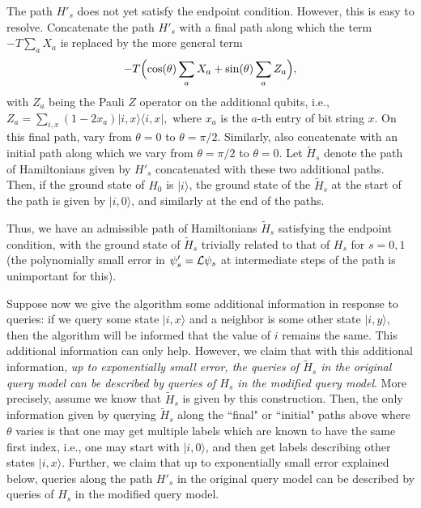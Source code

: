 \documentclass[letterpaper,onecolumn]{quantumarticle}
\newcommand{\isL}{{\cal L}}
\begin{document}
The path $H'_s$ does not yet satisfy the endpoint condition.  However, this is easy to resolve.  
Concatenate the path $H'_s$ with a final path along
which the term $-T \sum_a X_a$ is replaced by the more general term
$$-T\Bigl( \cos(\theta) \sum_a X_a + \sin(\theta) \sum_a Z_a\Bigr),$$
with $Z_a$ being the Pauli $Z$ operator on the additional qubits, i.e., $Z_a=\sum_{i,x} (1-2x_a)  |i,x\rangle \langle i,x|,$
where $x_a$ is the $a$-th entry of bit string $x$.
On this final path, vary from $\theta=0$ to $\theta=\pi/2$.
Similarly, also concatenate with an initial path along which we vary from $\theta=\pi/2$ to $\theta=0$.
Let $\tilde H_s$ denote the path of Hamiltonians given by $H'_s$ concatenated with these two additional paths.
Then, if the ground state of $H_0$ is $|i\rangle$, the ground state of the $\tilde H_s$ at the start of the path is given by $|i,0\rangle$, and similarly at the end of the paths.

Thus, we have an admissible path of Hamiltonians $\tilde H_s$ satisfying the endpoint condition, with the ground state of $\tilde H_s$ trivially related to that of $H_s$ for $s=0,1$ (the polynomially small error in $\psi'_s=\isL \psi_s$ at intermediate steps of the path is unimportant for this).

Suppose now we give the algorithm some additional information in response to queries: if we query some state $|i,x\rangle$ and a neighbor is some other state $|i,y\rangle$, then the algorithm will be informed that the value of $i$ remains the same.  This additional information can only help.
However, we claim that with this additional information, {\it up to exponentially small error, the queries of $\tilde H_s$ in the original query model can be described by queries of $H_s$ in the modified query model}.
More precisely, assume we know that $\tilde H_s$ is given by this construction.  Then, the only information given by querying $\tilde H_s$ along the ``final" or ``initial" paths above where $\theta$ varies is that one may get multiple labels which are known to have the same first index, i.e., one may start with $|i,0\rangle$, and then get labels describing other states $|i,x\rangle$.  Further, we claim that up to exponentially small error explained below, queries along the path $H'_s$ in the original query model can be described by queries of $H_s$ in the modified query model.
\end{document}
